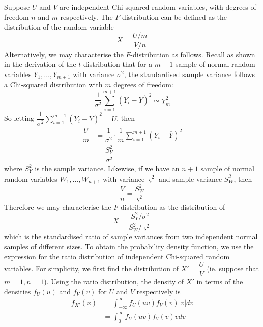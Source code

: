 \documentclass[11pt]{report} %
\begin{document}
Suppose $U$ and $V$ are independent Chi-squared random variables, with degrees of freedom $n$ and $m$ respectively. The $F$-distribution can be defined as the distribution of the random variable
\begin{equation}
X = \dfrac{U/m}{V/n}
\end{equation}
Alternatively, we may characterise the $F$-distribution as follows. Recall as shown in the derivation of the $t$ distribution that for a $m+1$ sample of normal random variables $Y_{1}, \dots, Y_{m + 1}$ with variance $\sigma^{2}$, the standardised sample variance follows a Chi-squared distribution with $m$ degrees of freedom:
\begin{equation}
\dfrac{1}{\sigma^{2}} \sum_{i = 1}^{m + 1}\left(Y_{i} - \overline{Y}\right)^{2} \sim \chi_{m}^{2}
\end{equation}
So letting $\dfrac{1}{\sigma^{2}} \sum_{i = 1}^{m + 1}\left(Y_{i} - \overline{Y}\right)^{2} = U$, then
\begin{align}
\dfrac{U}{m} &= \dfrac{1}{\sigma^{2}}\cdot\dfrac{1}{m}\sum_{i = 1}^{m + 1}\left(Y_{i} - \overline{Y}\right)^{2} \\
&= \dfrac{S_{Y}^{2}}{\sigma^{2}}
\end{align}
where $S_{Y}^{2}$ is the sample variance. Likewise, if we have an $n + 1$ sample of normal random variables $W_{1}, \dots, W_{n + 1}$ with variance $\varsigma^{2}$ and sample variance $S_{W}^{2}$, then
\begin{equation}
\dfrac{V}{n} = \dfrac{S_{W}^{2}}{\varsigma^{2}}
\end{equation}
Therefore we may characterise the $F$-distribution as the distribution of
\begin{equation}
X = \dfrac{S_{Y}^{2}/\sigma^{2}}{S_{W}^{2}/\varsigma^{2}}
\end{equation}
which is the standardised ratio of sample variances from two independent normal samples of different sizes. To obtain the probability density function, we use the expression for the ratio distribution of independent Chi-squared random variables. For simplicity, we first find the distribution of $X' = \dfrac{U}{V}$ (ie. suppose that $m = 1, n = 1$). Using the ratio distribution, the density of $X'$ in terms of the densities $f_{U}\left(u\right)$ and $f_{V}\left(v\right)$ for $U$ and $V$ respectively is
\begin{align}
f_{X'}\left(x\right) &= \int_{-\infty}^{\infty}f_{U}\left(uv\right)f_{V}\left(v\right)\left|v\right|dv \\
&= \int_{0}^{\infty}f_{U}\left(uv\right)f_{V}\left(v\right)vdv
\end{align}
\end{document}
